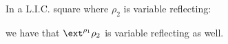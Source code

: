 \begin{lemma}\label{lem:lic-vrefl}
    In a L.I.C. square where $\rho_2$ is variable reflecting: 
    \begin{center}
    \end{center}
    we have that $\ext^{\rho_1}\rho_2$ is variable reflecting as well.
\end{lemma}
